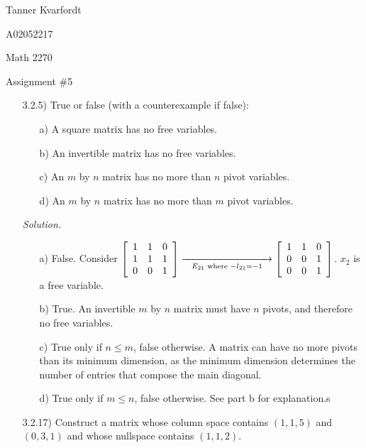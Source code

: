 \documentclass[12pt]{article}
\begin{document}
\hfill Tanner Kvarfordt

\hfill A02052217

\hfill Math 2270

\hfill Assignment \#5


\begin{itemize}
\item[3.2.5)] True or false (with a counterexample if false):
\begin{itemize}
\item[a)] A square matrix has no free variables.
\item[b)] An invertible matrix has no free variables.
\item[c)] An $m$ by $n$ matrix has no more than $n$ pivot variables.
\item[d)] An $m$ by $n$ matrix has no more than $m$ pivot variables.
\end{itemize}

\textit{Solution.}
\begin{itemize}
\item[a)] False. Consider $
\left[\begin{array}{ccc}
1 & 1 & 0 \\
1 & 1 & 1 \\
0 & 0 & 1
\end{array}\right]  
\underset{E_{21} \text{ where } -l_{21}=-1}{\xrightarrow{\hspace{30mm}}}
\left[\begin{array}{ccc}
1 & 1 & 0 \\
0 & 0 & 1 \\
0 & 0 & 1
\end{array}\right]$. $x_2$ is a free variable.
\item[b)] True. An invertible $m$ by $n$ matrix must have $n$ pivots, and therefore no free variables.
\item[c)] True only if $n \leq m$, false otherwise. A matrix can have no more pivots than its minimum dimension, as the minimum dimension determines the number of entries that compose the main diagonal.
\item[d)] True only if $m \leq n$, false otherwise. See part b for explanation.s
\end{itemize}

\item[3.2.17)] Construct a matrix whose column space contains $(1,1,5)$ and $(0,3,1)$ and whose nullspace contains $(1,1,2)$.


\end{itemize}
\end{document}
